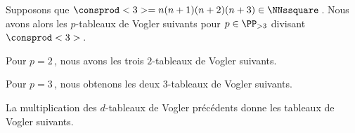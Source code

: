 Supposons que $\consprod<3> = n(n+1)(n+2)(n+3) \in \NNssquare$\,. Nous avons alors les $p$-tableaux de Vogler suivants pour $p \in \PP_{>3}$ divisant $\consprod<3>$\,.

\begin{center}
\end{center}


Pour $p = 2$\,, nous avons les trois $2$-tableaux de Vogler suivants.

\begin{center}
\end{center}


Pour $p = 3$\,, nous obtenons les deux $3$-tableaux de Vogler suivants.

\begin{center}
\end{center}


La multiplication des $d$-tableaux de Vogler précédents donne les tableaux de Vogler suivants.

